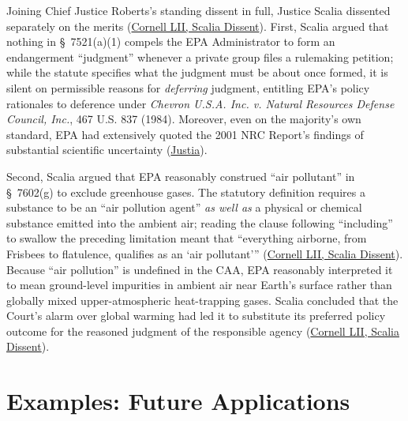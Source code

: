 \documentclass[12pt]{article}
\begin{document}
Joining Chief Justice Roberts's standing dissent in full, Justice Scalia dissented separately on the merits (\href{https://www.law.cornell.edu/supct/html/05-1120.ZD1.html}{Cornell LII, Scalia Dissent}). First, Scalia argued that nothing in \S\ 7521(a)(1) compels the EPA Administrator to form an endangerment ``judgment'' whenever a private group files a rulemaking petition; while the statute specifies what the judgment must be about once formed, it is silent on permissible reasons for \textit{deferring} judgment, entitling EPA's policy rationales to deference under \textit{Chevron U.S.A. Inc. v. Natural Resources Defense Council, Inc.}, 467 U.S. 837 (1984). Moreover, even on the majority's own standard, EPA had extensively quoted the 2001 NRC Report's findings of substantial scientific uncertainty (\href{https://supreme.justia.com/cases/federal/us/549/497/}{Justia}).

Second, Scalia argued that EPA reasonably construed ``air pollutant'' in \S\ 7602(g) to exclude greenhouse gases. The statutory definition requires a substance to be an ``air pollution agent'' \textit{as well as} a physical or chemical substance emitted into the ambient air; reading the clause following ``including'' to swallow the preceding limitation meant that ``everything airborne, from Frisbees to flatulence, qualifies as an `air pollutant''' (\href{https://www.law.cornell.edu/supct/html/05-1120.ZD1.html}{Cornell LII, Scalia Dissent}). Because ``air pollution'' is undefined in the CAA, EPA reasonably interpreted it to mean ground-level impurities in ambient air near Earth's surface rather than globally mixed upper-atmospheric heat-trapping gases. Scalia concluded that the Court's alarm over global warming had led it to substitute its preferred policy outcome for the reasoned judgment of the responsible agency (\href{https://www.law.cornell.edu/supct/html/05-1120.ZD1.html}{Cornell LII, Scalia Dissent}).

\section{Examples: Future Applications}
\end{document}
